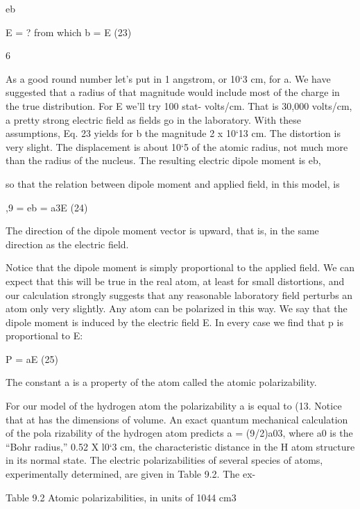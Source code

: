 {\begin{equation}
\end{equation}
eb

E = ? from which b = E (23)

6

As a good round number let's put in 1 angstrom, or 10‘3 cm, for a.
We have suggested that a radius of that magnitude would include
most of the charge in the true distribution. For E we'll try 100 stat-
volts/cm. That is 30,000 volts/cm, a pretty strong electric field as
fields go in the laboratory. With these assumptions, Eq. 23 yields
for b the magnitude 2 x 10‘13 cm. The distortion is very slight. The
displacement is about 10‘5 of the atomic radius, not much more than
the radius of the nucleus. The resulting electric dipole moment is eb,

so that the relation between dipole moment and applied field, in this
model, is

\begin{equation}
\end{equation}
,9 = eb = a3E (24)

The direction of the dipole moment vector is upward, that is, in the
same direction as the electric field.

Notice that the dipole moment is simply proportional to the applied
field. We can expect that this will be true in the real atom, at
least for small distortions, and our calculation strongly suggests that
any reasonable laboratory field perturbs an atom only very slightly.
Any atom can be polarized in this way. We say that the dipole
moment is induced by the electric field E. In every case we find that
p is proportional to E:

\begin{equation}
\end{equation}
P = aE (25)

The constant a is a property of the atom called the atomic
polarizability.

For our model of the hydrogen atom the polarizability a is equal
to (13. Notice that at has the dimensions of volume. An exact
quantum mechanical calculation of the pola rizability of the hydrogen
atom predicts a = (9/2)a03, where a0 is the ``Bohr radius,''
0.52 X l0‘3 cm, the characteristic distance in the H atom structure
in its normal state. The electric polarizabilities of several species of
atoms, experimentally determined, are given in Table 9.2. The ex-

Table 9.2 Atomic polarizabilities, in units of 1044 cm3

}
